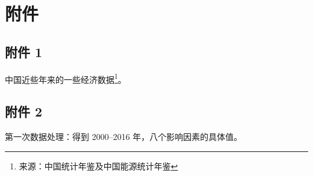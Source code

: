 \section{附件}

  \subsection{附件 1}
    中国近些年来的一些经济数据\footnote{来源：中国统计年鉴及中国能源统计年鉴}。
    \label{ssec:fujian1}

  \subsection{附件 2}
    第一次数据处理：得到 2000--2016 年，八个影响因素的具体值。
    \label{ssec:fujian2}